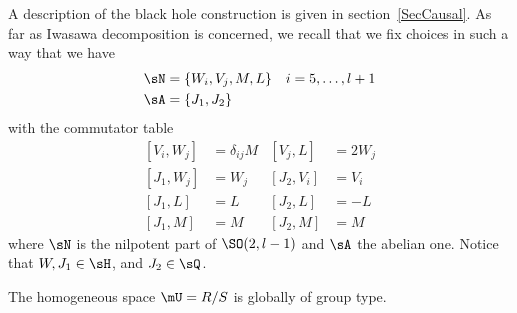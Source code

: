 A description of the black hole construction is given in section~\ref{SecCausal}. As far as Iwasawa decomposition is concerned, we recall that we fix choices in such a way that we have
\begin{subequations}
	\begin{align}
		\sN & =\{W_i,V_j,M,L\} & i=5,\ldots, l+1 \\
		\sA & =\{J_1,J_2\}
	\end{align}
\end{subequations}
with the commutator table
\begin{subequations} %
	\begin{align}
		[V_i,W_j] & =\delta_{ij}M & [V_j,L]   & =2W_j \\
		[J_1,W_j] & =W_j          & [J_2,V_i] & =V_i  \\
		[J_1,L]   & =L            & [J_2,L]   & =-L   \\
		[J_1,M]   & =M            & [J_2,M]   & =M
	\end{align}
\end{subequations}
where $\sN$ is the nilpotent part of $\SO(2,l-1)$ and $\sA$ the abelian one. Notice that $W,J_{1}\in\sH$, and $J_{2}\in\sQ$.

\begin{proposition}\label{PropRsurSglobgroup}
	The homogeneous space $\mU=R/S$ is globally of group type.
\end{proposition}


